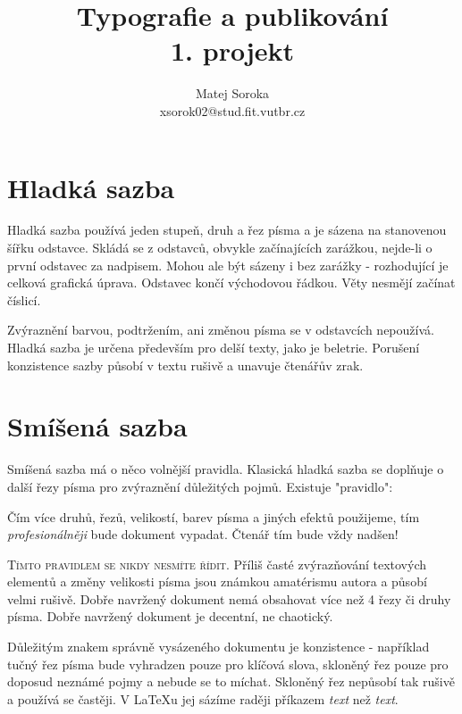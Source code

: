 \documentclass[czech,a4paper,10pt,twocolumn]{article}
\begin{document}
\title{Typografie a publikování\\1. projekt}
\author{Matej Soroka\\xsorok02@stud.fit.vutbr.cz}
\date{}

\maketitle

\section{Hladká sazba}

Hladká sazba používá jeden stupeň, druh a řez písma a je sázena na stanovenou šířku odstavce. Skládá se z odstavců, obvykle začínajících zarážkou, nejde-li o první odstavec za nadpisem. Mohou ale být sázeny i bez zarážky - rozhodující je celková grafická úprava. Odstavec končí východovou řádkou. Věty nesmějí začínat číslicí.

Zvýraznění barvou, podtržením, ani změnou písma se v odstavcích nepoužívá. Hladká sazba je určena především pro delší texty, jako je beletrie. Porušení konzistence sazby působí v textu rušivě a unavuje čtenářův zrak.

\section{Smíšená sazba}

Smíšená sazba má o něco volnější pravidla. Klasická hladká sazba se doplňuje o další řezy písma pro zvýraznění důležitých pojmů. Existuje "pravidlo":

\qquad Čím více {\ttfamily druhů}, řezů, velikostí, barev písma a jiných efektů použijeme, tím \emph{profesionálněji} bude dokument vypadat. Čtenář tím { \tiny bude} vždy { \huge nadšen!}

{\scshape Tímto pravidlem se nikdy nesmíte řídit}. Příliš časté zvýrazňování textových elementů a změny velikosti písma jsou známkou amatérismu autora a působí velmi rušivě. Dobře navržený dokument nemá obsahovat více než
4 řezy či druhy písma. Dobře navržený dokument je decentní, ne chaotický.

Důležitým znakem správně vysázeného dokumentu je konzistence - například tučný řez písma bude vyhradzen pouze pro klíčová slova, skloněný řez pouze pro doposud neznámé pojmy a nebude se to míchat. Skloněný řez nepůsobí tak rušivě a používá se častěji. V LaTeXu jej sázíme raději příkazem \emph{text} než \textit{text}.
\end{document}
